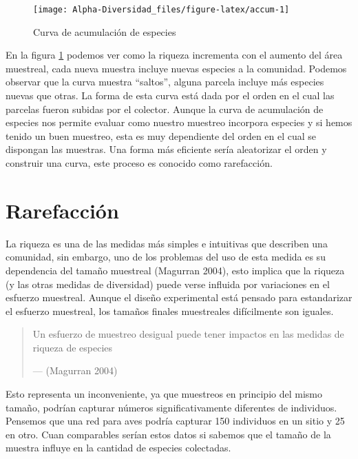 \documentclass[]{book}
\begin{document}
\begin{figure}

{\centering \texttt{[image: Alpha-Diversidad\_files/figure-latex/accum-1]} 

}

\caption{Curva de acumulación de especies}\label{fig:accum}
\end{figure}

En la figura \ref{fig:accum} podemos ver como la riqueza incrementa con
el aumento del área muestreal, cada nueva muestra incluye nuevas
especies a la comunidad. Podemos observar que la curva muestra
``saltos'', alguna parcela incluye más especies nuevas que otras. La
forma de esta curva está dada por el orden en el cual las parcelas
fueron subidas por el colector. Aunque la curva de acumulación de
especies nos permite evaluar como nuestro muestreo incorpora especies y
si hemos tenido un buen muestreo, esta es muy dependiente del orden en
el cual se dispongan las muestras. Una forma más eficiente sería
aleatorizar el orden y construir una curva, este proceso es conocido
como rarefacción.

\chapter{Rarefacción}\label{rarefaccion}

La riqueza es una de las medidas más simples e intuitivas que describen
una comunidad, sin embargo, uno de los problemas del uso de esta medida
es su dependencia del tamaño muestreal (Magurran 2004), esto implica que
la riqueza (y las otras medidas de diversidad) puede verse influida por
variaciones en el esfuerzo muestreal. Aunque el diseño experimental está
pensado para estandarizar el esfuerzo muestreal, los tamaños finales
muestreales difícilmente son iguales.

\begin{quote}
Un esfuerzo de muestreo desigual puede tener impactos en las medidas de
riqueza de especies

--- (Magurran 2004)
\end{quote}

Esto representa un inconveniente, ya que muestreos en principio del
mismo tamaño, podrían capturar números significativamente diferentes de
individuos. Pensemos que una red para aves podría capturar 150
individuos en un sitio y 25 en otro. Cuan comparables serían estos datos
si sabemos que el tamaño de la muestra influye en la cantidad de
especies colectadas.
\end{document}
